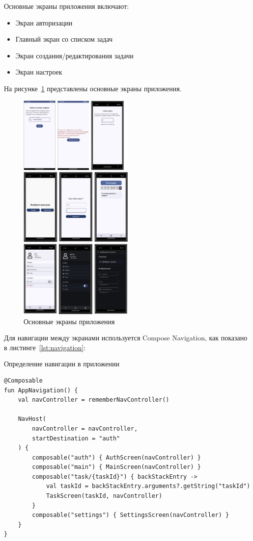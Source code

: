 \documentclass[14pt, russian]{scrartcl}
\begin{document}
Основные экраны приложения включают:

\begin{itemize}
\item Экран авторизации
\item Главный экран со списком задач
\item Экран создания/редактирования задачи
\item Экран настроек
\end{itemize}

На рисунке~\ref{fig:run} представлены основные экраны приложения.

\begin{figure}[!htb]
    \centering
      \includegraphics[width=0.5\textwidth]{Blanks-4LaTeX-main/app_screens.png}
    \caption{Основные экраны приложения}
    \label{fig:run}
    \end{figure}

Для навигации между экранами используется Compose Navigation, как показано в листинге~\ref{lst:navigation}:

\begin{listing}[!htb]
\caption{Определение навигации в приложении}
\vspace{-0.3cm}
\label{lst:navigation}
\begin{verbatim}
@Composable
fun AppNavigation() {
    val navController = rememberNavController()
    
    NavHost(
        navController = navController,
        startDestination = "auth"
    ) {
        composable("auth") { AuthScreen(navController) }
        composable("main") { MainScreen(navController) }
        composable("task/{taskId}") { backStackEntry ->
            val taskId = backStackEntry.arguments?.getString("taskId")
            TaskScreen(taskId, navController)
        }
        composable("settings") { SettingsScreen(navController) }
    }
}
\end{verbatim}
\end{listing}
\end{document}
